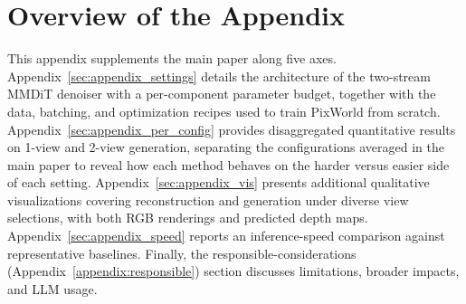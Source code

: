 \documentclass{article} %
\begin{document}










\clearpage
\appendix
\section{Overview of the Appendix}
This appendix supplements the main paper along five axes. Appendix~\ref{sec:appendix_settings} details the architecture of the two-stream MMDiT denoiser with a per-component parameter budget, together with the data, batching, and optimization recipes used to train PixWorld from scratch. Appendix~\ref{sec:appendix_per_config} provides disaggregated quantitative results on 1-view and 2-view generation, separating the configurations averaged in the main paper to reveal how each method behaves on the harder versus easier side of each setting. Appendix~\ref{sec:appendix_vis} presents additional qualitative visualizations covering reconstruction and generation under diverse view selections, with both RGB renderings and predicted depth maps. Appendix~\ref{sec:appendix_speed} reports an inference-speed comparison against representative baselines. Finally, the responsible-considerations (Appendix~\ref{appendix:responsible}) section discusses limitations, broader impacts, and LLM usage.



\end{document}
